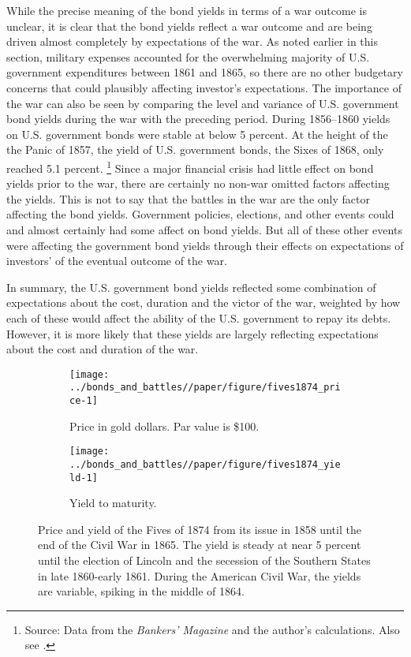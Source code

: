 
While the precise meaning of the bond yields in terms of a war outcome is unclear, it is clear that the bond yields reflect a war outcome and are being driven almost completely by expectations of the war.
As noted earlier in this section, military expenses accounted for the overwhelming majority of U.S. government expenditures between 1861 and 1865, so there are no other budgetary concerns that could plausibly affecting investor's expectations.
The importance of the war can also be seen by comparing the level and variance of U.S. government bond yields during the war with the preceding period.
During 1856--1860 yields on U.S. government bonds were stable at below 5 percent.
At the height of the the Panic of 1857, the yield of U.S. government bonds, the Sixes of 1868, only reached 5.1 percent.%
\footnote{Source: Data from the \textit{Bankers' Magazine} and the author's calculations. Also see \textcite{HomerSylla2005}.}
Since a major financial crisis had little effect on bond yields prior to the war, there are certainly no non-war omitted factors affecting the yields.
This is not to say that the battles in the war are the only factor affecting the bond yields.
Government policies, elections, and other events could and almost certainly had some affect on bond yields.
But all of these other events were affecting the government bond yields through their effects on expectations of investors' of the eventual outcome of the war.

In summary, the U.S. government bond yields reflected some combination of expectations about the cost, duration and the victor of the war, weighted by how each of these would affect the ability of the U.S. government to repay its debts.
However, it is more likely that these yields are largely reflecting expectations about the cost and duration of the war.

\begin{figure}[!htpb]
  \centering
  \begin{subfigure}[b]{\linewidth}
   \texttt{[image: ../bonds\_and\_battles//paper/figure/fives1874\_price-1]}
  \caption{Price in gold dollars. Par value is \$100.}
  \label{bonds:fig:fives1874_price}
\end{subfigure}
\begin{subfigure}[b]{\linewidth}
   \texttt{[image: ../bonds\_and\_battles//paper/figure/fives1874\_yield-1]}
  \caption{Yield to maturity.}
  \label{bonds:fig:fives1874_yield}
\end{subfigure}
\caption[Price and yield of the Fives of 1874, 1858-1865]{Price and yield of the Fives of 1874 from its issue in 1858 until the end of the Civil War in 1865.
The yield is steady at near 5 percent until the election of Lincoln and the secession of the Southern States in late 1860-early 1861.
During the American Civil War, the yields are variable, spiking in the middle of 1864.
 }
\label{bonds:fig:fives1874_yield_price}
\end{figure}


